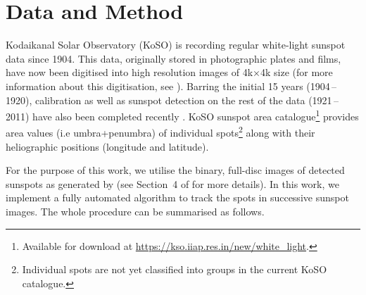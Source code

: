 \section{Data and Method}
\label{ch4-method}

Kodaikanal Solar Observatory (KoSO) is recording regular white-light sunspot data since 1904. This data, originally stored in photographic plates and films, have now been digitised into high resolution images of 4k$\times$4k size (for more information about this digitisation, see \citealp{Ravindra2013}). Barring the initial 15 years (1904\,--\,1920), calibration as well as sunspot detection on the rest of the data (1921\,--\,2011) have also been completed recently \citep{Ravindra2013, Mandal2017a}. KoSO sunspot area catalogue\footnote{Available for download at \url{https://kso.iiap.res.in/new/white_light}.} provides area values (i.e umbra+penumbra) of individual spots\footnote{Individual spots are not yet classified into groups in the current KoSO catalogue.} along with their heliographic positions (longitude and latitude). 


For the purpose of this work, we utilise the binary, full-disc images of detected sunspots as generated by \citet{Mandal2017a} (see Section~4 of \citet{Mandal2017a} for more details). In this work, we implement a fully automated algorithm to track the spots in successive sunspot images. The whole procedure can be summarised as follows.


